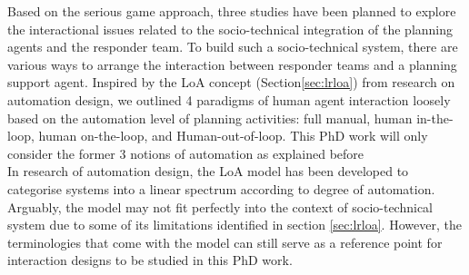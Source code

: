Based on the serious game approach, three studies have been planned to explore the interactional issues related to the socio-technical integration of the planning agents and the responder team. To build such a socio-technical system, there are various ways to arrange the interaction between responder teams and a planning support agent. Inspired by the \acf{LoA} concept (Section\ref{sec:lrloa}) from research on automation design, we outlined 4 paradigms of human agent interaction loosely based on the automation level of planning activities: full manual, human in-the-loop, human on-the-loop, and Human-out-of-loop. This PhD work will only consider the former 3 notions of automation as explained before\\

In research of automation design, the \ac{LoA} model has been developed to categorise systems into a linear spectrum according to degree of automation. Arguably, the model may not fit perfectly into the context of socio-technical system due to some of its limitations identified in section \ref{sec:lrloa}. However, the terminologies that come with the model can still serve as a reference point for interaction designs to be studied in this PhD work.


